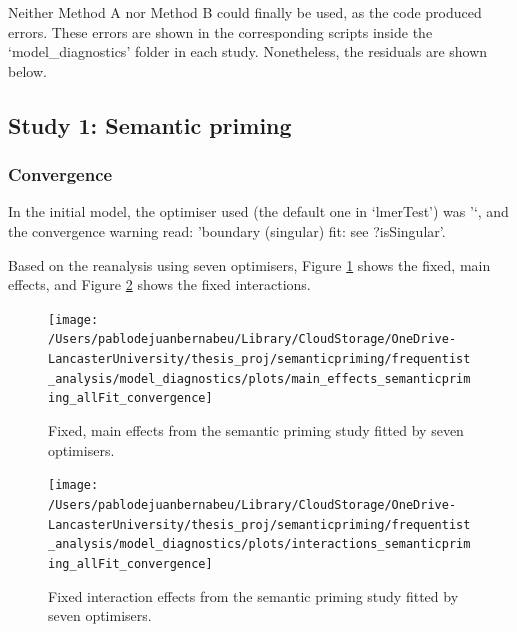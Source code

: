\documentclass[
  12pt,
  man,floatsintext]{apa7}
\begin{document}
Neither Method A nor Method B could finally be used, as the code produced errors. These errors are shown in the corresponding scripts inside the `model\_diagnostics' folder in each study. Nonetheless, the residuals are shown below.

\hypertarget{study-1-semantic-priming-1}{%
\subsection{Study 1: Semantic priming}\label{study-1-semantic-priming-1}}

\hypertarget{convergence-2}{%
\subsubsection{Convergence}\label{convergence-2}}

In the initial model, the optimiser used (the default one in `lmerTest') was '`, and the convergence warning read: 'boundary (singular) fit: see ?isSingular'.

Based on the reanalysis using seven optimisers, Figure \ref{fig:main-effects-semanticpriming-allFit-convergence} shows the fixed, main effects, and Figure \ref{fig:interactions-semanticpriming-allFit-convergence} shows the fixed interactions.

\begin{figure}

{\centering \texttt{[image: /Users/pablodejuanbernabeu/Library/CloudStorage/OneDrive-LancasterUniversity/thesis\_proj/semanticpriming/frequentist\_analysis/model\_diagnostics/plots/main\_effects\_semanticpriming\_allFit\_convergence]} 

}

\caption{Fixed, main effects from the semantic priming study fitted by seven optimisers.}\label{fig:main-effects-semanticpriming-allFit-convergence}
\end{figure}

\begin{figure}

{\centering \texttt{[image: /Users/pablodejuanbernabeu/Library/CloudStorage/OneDrive-LancasterUniversity/thesis\_proj/semanticpriming/frequentist\_analysis/model\_diagnostics/plots/interactions\_semanticpriming\_allFit\_convergence]} 

}

\caption{Fixed interaction effects from the semantic priming study fitted by seven optimisers.}\label{fig:interactions-semanticpriming-allFit-convergence}
\end{figure}
\end{document}

